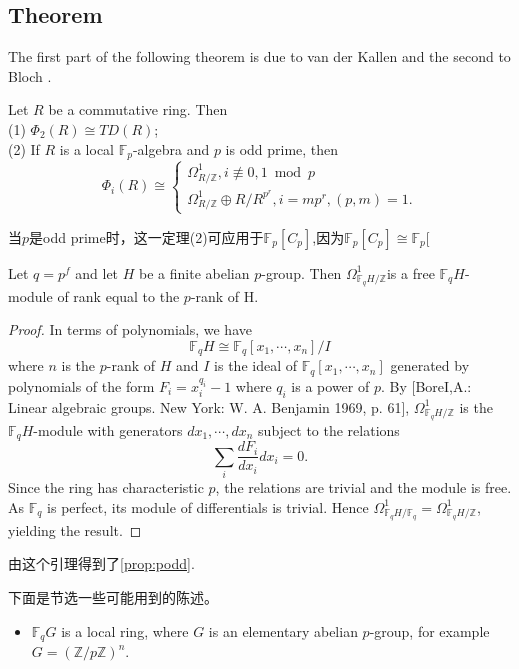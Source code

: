 \subsection{Theorem} %
\label{subsec:theorem}
The first part of the following theorem is due to van der Kallen \cite{MR45:252} and the
second to Bloch \cite{MR81j:14011}.
\begin{theorem}
	Let $R$ be a commutative ring. Then\\
(1) $\Phi_2(R) \cong  TD(R)$;\\
(2) If $R$ is a local $\mathbb{F}_p$-algebra and $p$ is odd prime, then
\[\Phi_i(R)\cong \begin{cases}
	\Omega^1_{R/\mathbb{Z}}, i \not\equiv 0,1 \bmod p\\
	\Omega^1_{R/\mathbb{Z}}\oplus R/R^{p^r}, i=mp^r, (p,m)=1.
\end{cases}\]
\end{theorem}
当$p$是odd prime时，这一定理(2)可应用于$\mathbb{F}_p[C_p]$,因为$\mathbb{F}_p[C_p]\cong \mathbb{F}_p[$
\begin{lemma}
	Let $q=p^f$ and let $H$ be a finite abelian $p$-group. Then $\Omega^1_{\mathbb{F}_q H/\mathbb{Z}}$is a free $\mathbb{F}_q H$-module of rank equal to the $p$-rank of H.
\end{lemma}
\begin{proof}
	In terms of polynomials, we have
	\[\mathbb{F}_q H\cong \mathbb{F}_q[x_1,\cdots,x_n]/I\]
where $n$ is the $p$-rank of $H$ and $I$ is the ideal of $\mathbb{F}_q[x_1,\cdots,x_n]$ generated by polynomials of the form  $F_i=x_i^{q_i}-1$ where $q_i$ is a power of $p$. By [BoreI,A.: Linear algebraic groups. New York: W. A. Benjamin 1969, p. 61],  $\Omega^1_{\mathbb{F}_qH/\mathbb{Z}}$
is the $\mathbb{F}_qH$-module with generators  $dx_1,\cdots,dx_n$ subject to the relations
\[\sum_i \frac{d F_i}{d x_i}d x_i =0.\]
Since the ring has characteristic $p$, the relations are trivial and the module is free. 
As $\mathbb{F}_q$ is perfect, its module of differentials is trivial. Hence $\Omega^1_{\mathbb{F}_q H/\mathbb{F}_q}=\Omega^1_{\mathbb{F}_q H/\mathbb{Z}}$,
yielding the result.
\end{proof}

由这个引理得到了\ref{prop:podd}. 

下面是节选一些可能用到的陈述。
\begin{itemize}
	\item  {\color{green} $\mathbb{F}_q G$ is a local ring}, where $G$ is an elementary abelian $p$-group, for example $G=(\mathbb{Z}/p \mathbb{Z})^n$.
\end{itemize}


